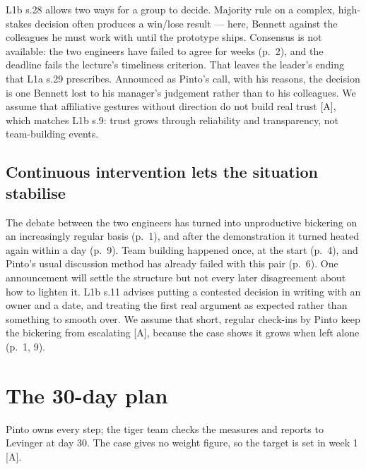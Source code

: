 \documentclass[oneside,final,11pt,letterpaper]{article}
\begin{document}
L1b s.28 allows two ways for a group to decide. Majority rule on a complex, high-stakes decision often produces a win/lose result --- here, Bennett against the colleagues he must work with until the prototype ships. Consensus is not available: the two engineers have failed to agree for weeks (p.~2), and the deadline fails the lecture's timeliness criterion. That leaves the leader's ending that L1a s.29 prescribes. Announced as Pinto's call, with his reasons, the decision is one Bennett lost to his manager's judgement rather than to his colleagues. We assume that affiliative gestures without direction do not build real trust [A], which matches L1b s.9: trust grows through reliability and transparency, not team-building events.

\subsection{Continuous intervention lets the situation stabilise}
The debate between the two engineers has turned into unproductive bickering on an increasingly regular basis (p.~1), and after the demonstration it turned heated again within a day (p.~9). Team building happened once, at the start (p.~4), and Pinto's usual discussion method has already failed with this pair (p.~6). One announcement will settle the structure but not every later disagreement about how to lighten it. L1b s.11 advises putting a contested decision in writing with an owner and a date, and treating the first real argument as expected rather than something to smooth over. We assume that short, regular check-ins by Pinto keep the bickering from escalating [A], because the case shows it grows when left alone (p.~1, 9).

\section{The 30-day plan}
Pinto owns every step; the tiger team checks the measures and reports to Levinger at day 30. The case gives no weight figure, so the target is set in week 1 [A].
\end{document}
